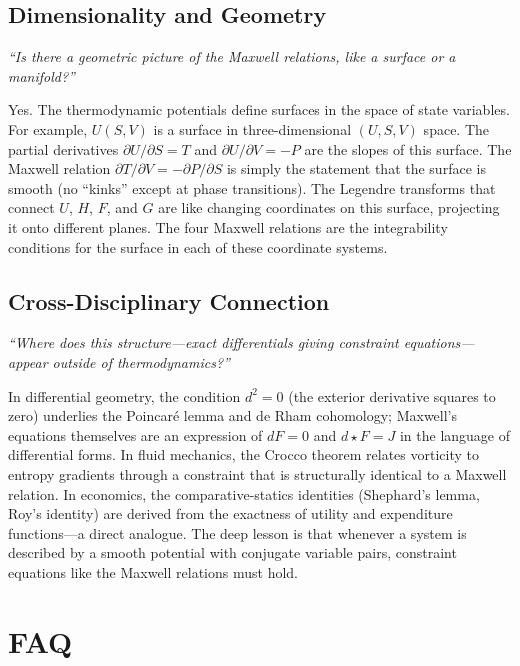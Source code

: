 \subsection*{Dimensionality and Geometry}
\textit{``Is there a geometric picture of the Maxwell relations, like a surface or a manifold?''}

Yes. The thermodynamic potentials define surfaces in the space of state variables. For example, $U(S,V)$ is a surface in three-dimensional $(U, S, V)$ space. The partial derivatives $\partial U/\partial S = T$ and $\partial U/\partial V = -P$ are the slopes of this surface. The Maxwell relation $\partial T/\partial V = -\partial P/\partial S$ is simply the statement that the surface is smooth (no ``kinks'' except at phase transitions). The Legendre transforms that connect $U$, $H$, $F$, and $G$ are like changing coordinates on this surface, projecting it onto different planes. The four Maxwell relations are the integrability conditions for the surface in each of these coordinate systems.

\subsection*{Cross-Disciplinary Connection}
\textit{``Where does this structure---exact differentials giving constraint equations---appear outside of thermodynamics?''}

In differential geometry, the condition $d^{2} = 0$ (the exterior derivative squares to zero) underlies the Poincaré lemma and de Rham cohomology; Maxwell's equations themselves are an expression of $dF = 0$ and $d{\star}F = J$ in the language of differential forms. In fluid mechanics, the Crocco theorem relates vorticity to entropy gradients through a constraint that is structurally identical to a Maxwell relation. In economics, the comparative-statics identities (Shephard's lemma, Roy's identity) are derived from the exactness of utility and expenditure functions---a direct analogue. The deep lesson is that whenever a system is described by a smooth potential with conjugate variable pairs, constraint equations like the Maxwell relations must hold.

\section*{FAQ}

